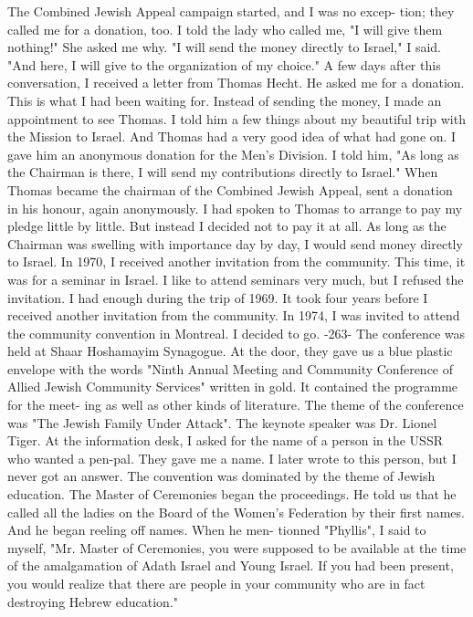 The Combined Jewish Appeal campaign started, and I was no excep-
tion; they called me for a donation, too. I told the lady who 
called me, "I will give them nothing!" She asked me why. 
"I will send the money directly to Israel," I said. "And here, 
I will give to the organization of my choice." 
A few days after this conversation, I received a 
letter from Thomas Hecht. He asked me for a donation. This is 
what I had been waiting for. Instead of sending the money, I made 
an appointment to see Thomas. I told him a few things about my 
beautiful trip with the Mission to Israel. And Thomas had a very 
good idea of what had gone on. I gave him an anonymous donation 
for the Men's Division. I told him, "As long as the Chairman is 
there, I will send my contributions directly to Israel." 
When Thomas became the chairman of the Combined Jewish Appeal, 
sent a donation in his honour, again anonymously. I had spoken to 
Thomas to arrange to pay my pledge little by little. But instead I 
decided not to pay it at all. As long as the Chairman was swelling 
with importance day by day, I would send money directly to Israel. 
In 1970, I received another invitation from the community. This 
time, it was for a seminar in Israel. I like to attend seminars very 
much, but I refused the invitation. I had enough during the trip of 
1969. 
It took four years before I received another invitation from the 
community. In 1974, I was invited to attend the community convention 
in Montreal. I decided to go. 
-263- 
The conference was held at Shaar Hoshamayim Synagogue. At the 
door, they gave us a blue plastic envelope with the words "Ninth 
Annual Meeting and Community Conference of Allied Jewish Community 
Services" written in gold. It contained the programme for the meet-
ing as well as other kinds of literature. The theme of the conference was "The Jewish Family Under Attack". The keynote speaker was 
Dr. Lionel Tiger. At the information desk, I asked for the name of 
a person in the USSR who wanted a pen-pal. They gave me a name. I 
later wrote to this person, but I never got an answer. 
The convention was dominated by the theme of Jewish education. 
The Master of Ceremonies began the proceedings. He told us that 
he called all the ladies on the Board of the Women's Federation by 
their first names. And he began reeling off names. When he men-
tionned "Phyllis", I said to myself, "Mr. Master of Ceremonies, you 
were supposed to be available at the time of the amalgamation of 
Adath Israel and Young Israel. If you had been present, you would 
realize that there are people in your community who are in fact destroying Hebrew education." 
